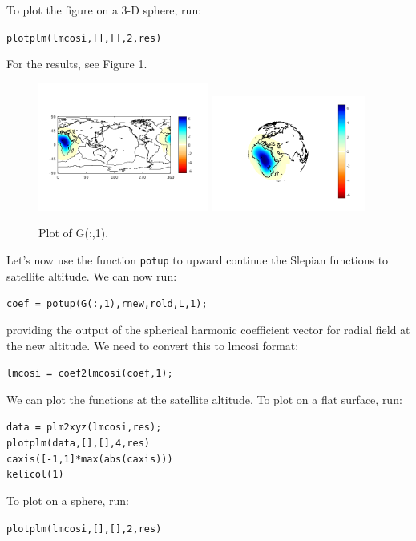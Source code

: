 \documentclass[11pt]{article}
\begin{document}
To plot the figure on a 3-D sphere, run:

\verb+plotplm(lmcosi,[],[],2,res)+

For the results, see Figure 1.
\begin{figure}[H]
  \includegraphics[width=0.5\textwidth]{figures/G(:,1)flatml.png}
  \includegraphics[width=0.45\textwidth]{figures/G(:,1)ml.png}
  \caption{Plot of G(:,1).}
\label{G(:,1)}
\end{figure}
Let's now use the function \verb+potup+ to upward continue the Slepian functions to satellite altitude.  We can now run:

\verb+coef = potup(G(:,1),rnew,rold,L,1);+

providing the output of the spherical harmonic coefficient vector for radial field at the new altitude.  We need to convert this to lmcosi format:

\verb+lmcosi = coef2lmcosi(coef,1);+

We can plot the functions at the satellite altitude.  To plot on a flat surface, run:

\verb+data = plm2xyz(lmcosi,res);+\\
\verb+plotplm(data,[],[],4,res)+\\
\verb+caxis([-1,1]*max(abs(caxis)))+\\
\verb+kelicol(1)+

To plot on a sphere, run:

\verb+plotplm(lmcosi,[],[],2,res)+
\end{document}
